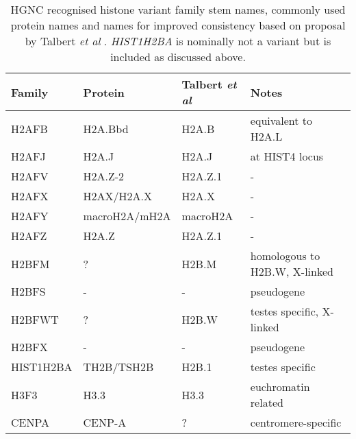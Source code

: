   \begin{table*}
    \caption{HGNC recognised histone variant family stem names, commonly used protein names 
	and names for improved consistency based on proposal by Talbert \textit{et al} \citep{Talbert2012}. 
	\textit{HIST1H2BA} is nominally not a variant but is included as discussed above.}
    \label{tab:histone-variant-families}
    \centering
    \begin{tabular}{l l l l}
      \toprule
      Family & Protein & Talbert \textit{et al} & Notes \\
      \midrule
	  H2AFB & H2A.Bbd & H2A.B & equivalent to H2A.L \\
	  H2AFJ & H2A.J & H2A.J & at HIST4 locus \\
	  H2AFV & H2A.Z-2 & H2A.Z.1 & - \\
	  H2AFX & H2AX/H2A.X & H2A.X & - \\
	  H2AFY & macroH2A/mH2A & macroH2A & - \\
	  H2AFZ & H2A.Z & H2A.Z.1 & - \\
	  H2BFM & ? & H2B.M & homologous to H2B.W, X-linked\\
	  H2BFS & - & - & pseudogene \\
	  H2BFWT & ? & H2B.W & testes specific, X-linked \\
	  H2BFX & - & - & pseudogene \\
	  HIST1H2BA & TH2B/TSH2B & H2B.1 & testes specific \\
	  H3F3 & H3.3 & H3.3 & euchromatin related \\
	  CENPA & CENP-A & ? & centromere-specific \\
	\bottomrule
    \end{tabular}
  \end{table*}





